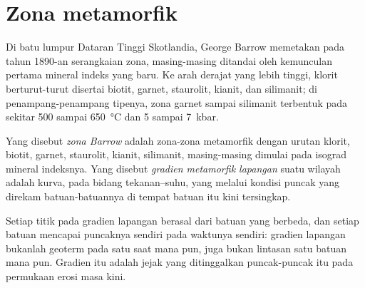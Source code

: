 \section{Zona metamorfik}\label{sec:b2:pt-paths:zones}

Di batu lumpur Dataran Tinggi Skotlandia, George Barrow memetakan pada tahun 1890-an serangkaian
zona, masing-masing ditandai oleh kemunculan pertama mineral indeks yang baru. Ke arah derajat
yang lebih tinggi, klorit berturut-turut disertai biotit, garnet, staurolit, kianit, dan silimanit;
di penampang-penampang tipenya, zona garnet sampai silimanit terbentuk pada sekitar 500 sampai
\qty{650}{\celsius} dan 5 sampai \qty{7}{kbar}.

\begin{definition}\label{def:b2:pt-paths:barrovian}
Yang disebut \emph{zona Barrow} adalah zona-zona metamorfik
 dengan urutan klorit, biotit, garnet, staurolit, kianit, silimanit,
masing-masing dimulai pada isograd mineral indeksnya. Yang disebut \emph{gradien metamorfik
lapangan} suatu wilayah adalah kurva, pada bidang
tekanan--suhu, yang melalui kondisi puncak yang direkam batuan-batuannya di
tempat batuan itu kini tersingkap.
\end{definition}

Setiap titik pada gradien lapangan berasal dari batuan yang berbeda, dan setiap batuan mencapai
puncaknya sendiri pada waktunya sendiri: gradien lapangan bukanlah geoterm pada satu saat mana pun, juga bukan
lintasan satu batuan mana pun. Gradien itu adalah jejak yang ditinggalkan puncak-puncak itu pada permukaan erosi masa kini.

